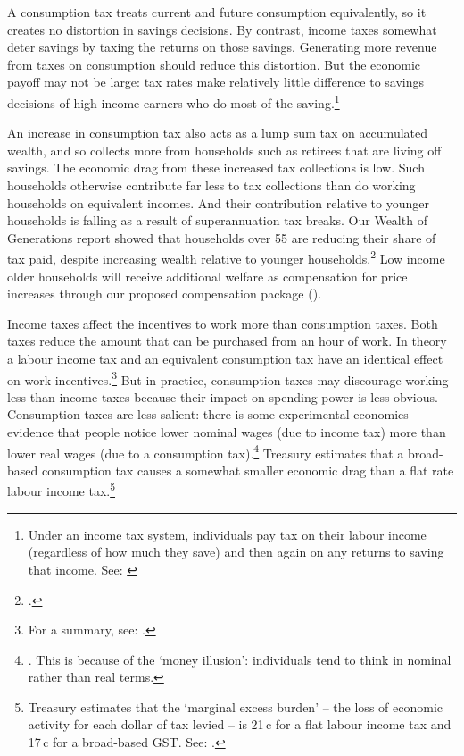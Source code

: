 A consumption tax treats current and future consumption equivalently, so it creates no distortion in savings decisions. By contrast, income taxes somewhat deter savings by taxing the returns on those savings.  Generating more revenue from taxes on consumption should reduce this distortion. But the economic payoff may not be large: tax rates make relatively little difference to savings decisions of high-income earners who do most of the saving.\footnote{Under an income tax system, individuals pay tax on their labour income (regardless of how much they save) and then again on any returns to saving that income. See: \textcite{HenryTaxReview2010}}    

An increase in consumption tax also acts as a lump sum tax on accumulated wealth, and so collects more from households such as retirees that are living off savings. The economic drag from these increased tax collections is low. Such households otherwise contribute far less to tax collections than do working households on equivalent incomes.  And their contribution relative to younger households is falling as a result of superannuation tax breaks. Our Wealth of Generations report showed that households over 55 are reducing their share of tax paid, despite increasing wealth relative to younger households.\footcite[][27]{DaleyWoodWeidmannEtAl2014}  Low income older households will receive additional welfare as compensation for price increases through our proposed compensation package ().

Income taxes affect the incentives to work more than consumption taxes. Both taxes reduce the amount that can be purchased from an hour of work. In theory a labour income tax and an equivalent consumption tax have an identical effect on work incentives.\footnote{For a summary, see: \textcite[][458]{McCaffry2008}.}  But in practice, consumption taxes may discourage working less than income taxes because their impact on spending power is less obvious. Consumption taxes are less salient: there is some experimental economics evidence that people notice lower nominal wages (due to income tax) more than lower real wages (due to a consumption tax).\footnote{\textcites{BlumkinRuffleGanun2012}{SausgruberTyran2005}. This is because of the ‘money illusion’: individuals tend to think in nominal rather than real terms.}  Treasury estimates that a broad-based consumption tax causes a somewhat smaller economic drag than a flat rate labour income tax.\footnote{Treasury estimates that the ‘marginal excess burden’ – the loss of economic activity for each dollar of tax levied – is 21\,c for a flat labour income tax and 17\,c for a broad-based GST. See: \textcite[][25]{Treasury2015ReThink}.}  

